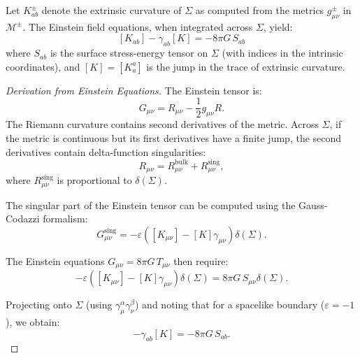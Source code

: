 \begin{proposition}
\label{prop:Israel}
Let $K^{\pm}_{ab}$ denote the extrinsic curvature of $\Sigma$ as computed from the metrics $g^{\pm}_{\mu\nu}$ in $\mathcal{M}^{\pm}$. The Einstein field equations, when integrated across $\Sigma$, yield:
\begin{equation}
\label{eq:Israel_junction}
\boxed{\left[ K_{ab} \right] - \gamma_{ab} \left[ K \right] = -8\pi G \, S_{ab}}
\end{equation}
where $S_{ab}$ is the surface stress-energy tensor on $\Sigma$ (with indices in the intrinsic coordinates), and $[K] = [K^a_a]$ is the jump in the trace of extrinsic curvature.
\end{proposition}

\begin{proof}[Derivation from Einstein Equations]
The Einstein tensor is:
\begin{equation}
G_{\mu\nu} = R_{\mu\nu} - \frac{1}{2} g_{\mu\nu} R.
\end{equation}
The Riemann curvature contains second derivatives of the metric. Across $\Sigma$, if the metric is continuous but its first derivatives have a finite jump, the second derivatives contain delta-function singularities:
\begin{equation}
R_{\mu\nu} = R^{\text{bulk}}_{\mu\nu} + R^{\text{sing}}_{\mu\nu},
\end{equation}
where $R^{\text{sing}}_{\mu\nu}$ is proportional to $\delta(\Sigma)$.

The singular part of the Einstein tensor can be computed using the Gauss-Codazzi formalism:
\begin{equation}
G^{\text{sing}}_{\mu\nu} = -\varepsilon \left( [K_{\mu\nu}] - [K] \gamma_{\mu\nu} \right) \delta(\Sigma).
\end{equation}

The Einstein equations $G_{\mu\nu} = 8\pi G \, T_{\mu\nu}$ then require:
\begin{equation}
-\varepsilon \left( [K_{\mu\nu}] - [K] \gamma_{\mu\nu} \right) \delta(\Sigma) = 8\pi G \, S_{\mu\nu} \delta(\Sigma).
\end{equation}

Projecting onto $\Sigma$ (using $\gamma^\alpha_\mu \gamma^\beta_\nu$) and noting that for a spacelike boundary ($\varepsilon = -1$), we obtain:
\begin{equation}
[K_{ab}] - \gamma_{ab} [K] = -8\pi G \, S_{ab}.
\end{equation}
\end{proof}

